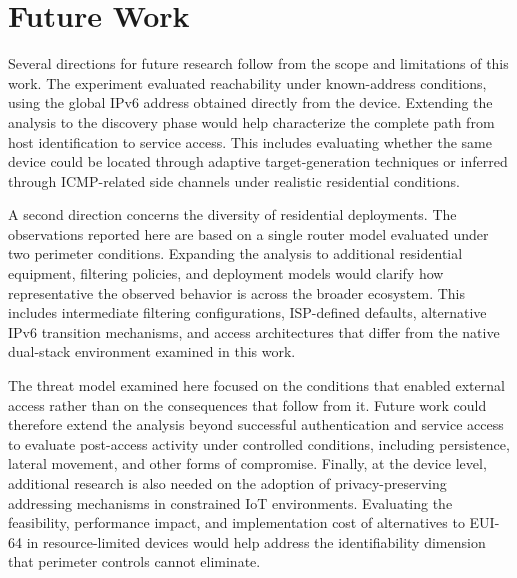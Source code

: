 \section{Future Work}

Several directions for future research follow from the scope and limitations of this work. The experiment evaluated reachability under known-address conditions, using the global IPv6 address obtained directly from the device. Extending the analysis to the discovery phase would help characterize the complete path from host identification to service access. This includes evaluating whether the same device could be located through adaptive target-generation techniques or inferred through ICMP-related side channels under realistic residential conditions.

A second direction concerns the diversity of residential deployments. The observations reported here are based on a single router model evaluated under two perimeter conditions. Expanding the analysis to additional residential equipment, filtering policies, and deployment models would clarify how representative the observed behavior is across the broader ecosystem. This includes intermediate filtering configurations, ISP-defined defaults, alternative IPv6 transition mechanisms, and access architectures that differ from the native dual-stack environment examined in this work.

The threat model examined here focused on the conditions that enabled external access rather than on the consequences that follow from it. Future work could therefore extend the analysis beyond successful authentication and service access to evaluate post-access activity under controlled conditions, including persistence, lateral movement, and other forms of compromise. Finally, at the device level, additional research is also needed on the adoption of privacy-preserving addressing mechanisms in constrained IoT environments. Evaluating the feasibility, performance impact, and implementation cost of alternatives to EUI-64 in resource-limited devices would help address the identifiability dimension that perimeter controls cannot eliminate.